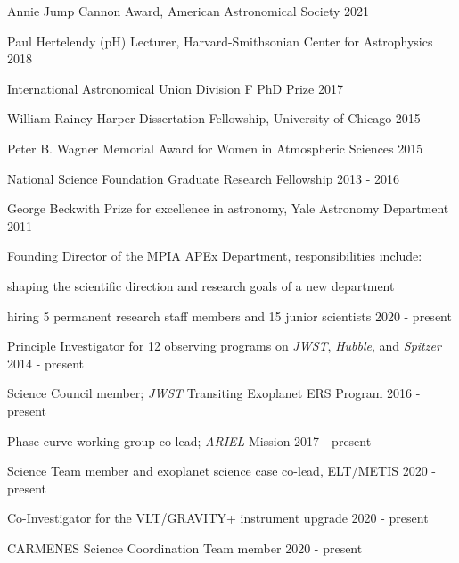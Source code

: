 \documentclass[12pt,letterpaper]{article}
\begin{document}

\begin{list}{}{\cvlist}
\item Annie Jump Cannon Award, American Astronomical Society \hfill 2021
\item Paul Hertelendy (pH) Lecturer, Harvard-Smithsonian Center for Astrophysics \hfill 2018 
\item International Astronomical Union Division F PhD Prize \hfill 2017
\item William Rainey Harper Dissertation Fellowship, University of Chicago \hfill 2015
\item Peter B. Wagner Memorial Award for Women in Atmospheric Sciences \hfill 2015
\item National Science Foundation Graduate Research Fellowship \hfill 2013 - 2016
\item George Beckwith Prize for excellence in astronomy, Yale Astronomy Department \hfill2011

\end{list}


\begin{list}{}{\cvlist}
\item Founding Director of the MPIA APEx Department, responsibilities include:
    \begin{sloppypar}
        \begin{compactitem}
        \item shaping the scientific direction and research goals of a new department
        \item hiring 5 permanent research staff members and 15 junior scientists \hfill 2020 - present
        \end{compactitem}
    \end{sloppypar}
\item Principle Investigator for 12 observing programs on \emph{JWST}, \emph{Hubble}, and \emph{Spitzer} \hfill 2014 - present
\item Science Council member; \emph{JWST} Transiting Exoplanet ERS Program \hfill 2016 - present
\item Phase curve working group co-lead; \emph{ARIEL} Mission \hfill 2017 - present
\item Science Team member and exoplanet science case co-lead, ELT/METIS \hfill 2020 - present
\item Co-Investigator for the VLT/GRAVITY+ instrument upgrade \hfill 2020 - present
\item CARMENES Science Coordination Team member \hfill 2020 - present

\end{list}
\end{document}

